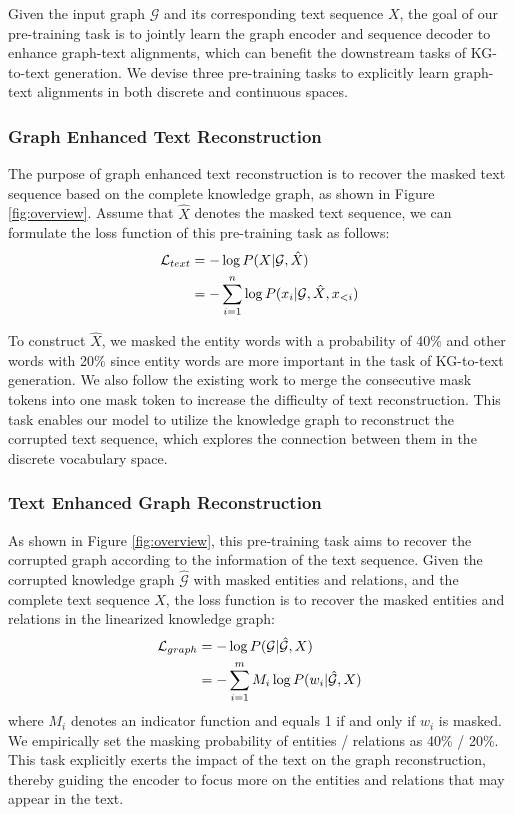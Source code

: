 \documentclass[11pt,a4paper]{article}
\begin{document}
Given the input graph $\mathcal{G}$ and its corresponding text sequence $X$, the goal of our pre-training task is to jointly learn the graph encoder and sequence decoder to enhance graph-text alignments, which can benefit the downstream tasks of KG-to-text generation.
We devise three pre-training tasks to explicitly learn graph-text alignments in both discrete and continuous spaces.

\subsubsection{Graph Enhanced Text Reconstruction}




The purpose of graph enhanced text reconstruction is to recover the masked text sequence based on the complete knowledge graph, as shown in Figure \ref{fig:overview}. Assume that $\hat{X}$ denotes the masked text sequence, we can formulate the loss function of this pre-training task as follows:
\begin{align}
    \mathcal{L}_{text} & = -\log P(X|\mathcal{G},\hat{X}) \notag \\
    & = -\sum_{i=1}^n \log P(x_i|\mathcal{G},\hat{X},x_{<i})
\end{align}

To construct $\hat{X}$, we masked the entity words with a probability of 40\% and other words with 20\% since entity words are more important in the task of KG-to-text generation. We also follow the existing work \cite{lewis2020bart} to merge the consecutive mask tokens into one mask token to increase the difficulty of text reconstruction. This task enables our model to utilize the knowledge graph to reconstruct the corrupted text sequence, which explores the connection between them in the discrete vocabulary space.

\subsubsection{Text Enhanced Graph Reconstruction}
As shown in Figure \ref{fig:overview}, this pre-training task aims to recover the corrupted graph according to the information of the text sequence. Given the corrupted knowledge graph $\hat{\mathcal{G}}$ with masked entities and relations, and the complete text sequence $X$, the loss function is to recover the masked entities and relations in the linearized knowledge graph:
\begin{align}
    \mathcal{L}_{graph} & = -\log P(\mathcal{G}|\hat{\mathcal{G}}, X) \notag \\
    & = -\sum_{i=1}^m M_i \log P(w_i|\hat{\mathcal{G}}, X)
\end{align}
where $M_i$ denotes an indicator function and equals 1 if and only if $w_i$ is masked. We empirically set the masking probability of entities / relations as 40\% / 20\%. This task explicitly exerts the impact of the text on the graph reconstruction, thereby guiding the encoder to focus more on the entities and relations that may appear in the text. 
\end{document}
